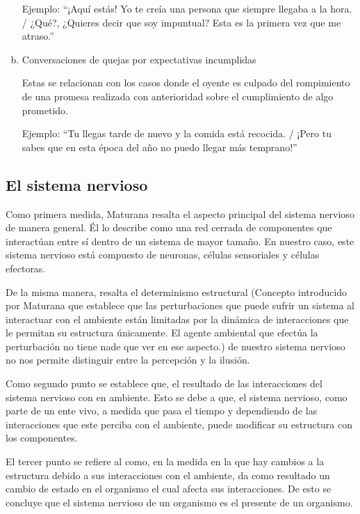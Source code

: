 \documentclass[10pt]{article}
\begin{document}
\begin{enumerate}[a.]
        Ejemplo: ``¡Aquí estás! Yo te creía una persona que siempre llegaba a la hora. / ¿Qué?, ¿Quieres decir que soy impuntual? Esta es la primera vez que me atraso.''
        
        \item Conversaciones de quejas por expectativas incumplidas
            
        Estas se relacionan con los casos donde el oyente es culpado del rompimiento de una promesa realizada con anterioridad sobre el cumplimiento de algo prometido.
                
        Ejemplo: ``Tu llegas tarde de nuevo y la comida está recocida. / ¡Pero tu sabes que en esta época del año no puedo llegar más temprano!''

        \end{enumerate}

        \subsection{El sistema nervioso}

        Como primera medida, Maturana resalta el aspecto principal del sistema nervioso de manera general. Él lo describe como una red cerrada de componentes que interactúan entre sí dentro de un sistema de mayor tamaño. En nuestro caso, este sistema nervioso está compuesto de neuronas, células sensoriales y células efectoras. 

        De la misma manera, resalta el determinismo estructural (Concepto introducido por Maturana que establece que las perturbaciones que puede sufrir un sistema al interactuar con el ambiente están limitadas por la dinámica de interacciones que le permitan su estructura únicamente. El agente ambiental que efectúa la perturbación no tiene nade que ver en ese aspecto.) de nuestro sistema nervioso no nos permite distinguir entre la percepción y la ilusión. 

        Como segundo punto se establece que, el resultado de las interacciones del sistema nervioso con en ambiente. Esto se debe a que, el sistema nervioso, como parte de un ente vivo, a medida que pasa el tiempo y dependiendo de las interacciones que este perciba con el ambiente, puede modificar su estructura con los componentes.

        El tercer punto se refiere al como, en la medida en la que hay cambios a la estructura debido a sus interacciones con el ambiente, da como resultado un cambio de estado en el organismo el cual afecta sus interacciones. De esto se concluye que el sistema nervioso de un organismo es el presente de un organismo.
\end{document}
